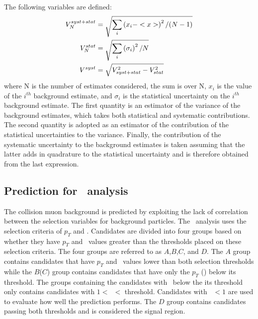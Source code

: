 The following variables are defined:
\begin{equation}
\centering
\begin{split}
V^{syst+stat}_{N} &= \sqrt{\sum_i \left( x_i - <x> \right) ^2/(N-1)} \\
V^{stat}_{N} &= \sqrt{\sum_i \left( \sigma _i \right) ^2/N} \\
V^{syst} &= \sqrt{V_{syst+stat}^2-V_{stat}^2} \\
\end{split}
\label{eq:variance}
\end{equation}
where N is the number of estimates considered,
the sum is over N, $x_i$ is the value of the $i^{th}$ background estimate,
and $\sigma_i$ is the statistical uncertainty on
the $i^{th}$ background estimate. The first quantity is an estimator of the
variance of the background estimates, which takes both statistical
and systematic contributions. The second quantity is adopted as an
estimator of the contribution of the statistical uncertainties
to the variance. Finally, the contribution of the
systematic uncertainty to the background estimates is taken assuming
that the latter adds in quadrature to the statistical uncertainty and
is therefore obtained from the last expression.

\subsection{Prediction for \muononly\ analysis \label{sec:MuOnlyPred}}

The collision muon  background is predicted by exploiting the lack of correlation between the selection variables for background particles. 
The \muononly\ analysis uses the selection criteria of $p_T$ and \invbeta. Candidates are divided into four groups based on whether they
have $p_T$ and \invbeta\ values greater than the thresholds placed on these selection criteria. 
The four groups are referred to as $A$,$B$,$C$, and $D$. The $A$ group contains candidates that have $p_T$ and \invbeta\ values lower than both selection thresholds
while the $B$($C$) group contains candidates that have only the $p_T$ (\invbeta) below its threshold. The groups containing the candidates with \invbeta\
below the its threshold only contains candidates with $1 < $\invbeta\ $< $ threshold. Candidates with \invbeta\ $< 1$ are used to evaluate how well the prediction performs.
The $D$ group contains candidates passing both thresholds and is considered the signal region. 

